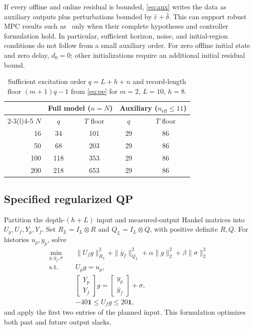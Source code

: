 \documentclass[letterpaper,10pt,conference]{ieeeconf}
\theoremstyle{remark}\newtheorem{remark}{Remark}
\newcommand{\neff}{n_{\mathrm{eff}}}
\begin{document}
If every offline and online residual is bounded, \eqref{eq:aux} writes the data as auxiliary outputs plus perturbations bounded by $\bar\varepsilon+\bar\delta$. This can support robust MPC results such as~\cite[Thm.~2]{bongard} only when their complete hypotheses and controller formulation hold. In particular, sufficient horizon, noise, and initial-region conditions do not follow from a small auxiliary order. For zero offline initial state and zero delay, $d_0=0$; other initializations require an additional initial residual bound.

\begin{table}[t]\centering
\caption{Sufficient excitation order $q=L+h+n$ and record-length floor $(m+1)q-1$ from \eqref{eq:pe} for $m=2$, $L=10$, $h=8$.}\label{tab:pe}
\begin{tabular}{@{}rcccc@{}}\toprule
&\multicolumn{2}{c}{Full model ($n=N$)}&\multicolumn{2}{c}{Auxiliary ($\neff\le11$)}\\\cmidrule(lr){2-3}\cmidrule(l){4-5}
$N$&$q$&$T$ floor&$q$&$T$ floor\\\midrule
16&34&101&29&86\\
50&68&203&29&86\\
100&118&353&29&86\\
200&218&653&29&86\\\bottomrule
\end{tabular}
\end{table}

\subsection{Specified regularized QP}
Partition the depth-$(h+L)$ input and measured-output Hankel matrices into $U_p,U_f,Y_p,Y_f$. Set $R_L=I_L\otimes R$ and $Q_L=I_L\otimes Q$, with positive definite $R,Q$. For histories $u_p,y_p$, solve
\begin{equation}\label{eq:qp}
\begin{split}
\min_{g,\bar y_f,\sigma}\quad&
\|U_fg\|_{R_L}^2+\|\bar y_f\|_{Q_L}^2
+\alpha\|g\|_2^2+\beta\|\sigma\|_2^2\\
\mathrm{s.t.}\quad& U_pg=u_p,\\
&\begin{bmatrix}Y_p\\Y_f\end{bmatrix}g
=\begin{bmatrix}y_p\\\bar y_f\end{bmatrix}+\sigma,\\
&-40\mathbf1\le U_fg\le20\mathbf1,
\end{split}
\end{equation}
and apply the first two entries of the planned input. This formulation optimizes both past and future output slacks.
\end{document}
